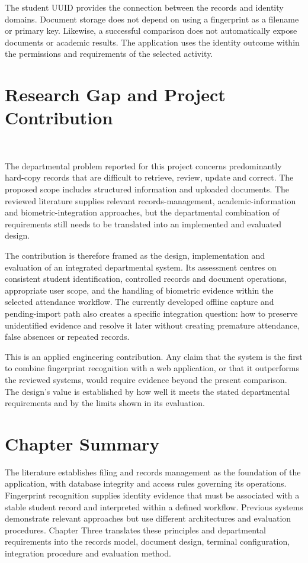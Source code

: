 The student UUID provides the connection between the records and identity domains. Document storage does not depend on using a fingerprint as a filename or primary key. Likewise, a successful comparison does not automatically expose documents or academic results. The application uses the identity outcome within the permissions and requirements of the selected activity.

\section{Research Gap and Project Contribution}~\label{sec:2-10}

The departmental problem reported for this project concerns predominantly hard-copy records that are difficult to retrieve, review, update and correct. The proposed scope includes structured information and uploaded documents. The reviewed literature supplies relevant records-management, academic-information and biometric-integration approaches, but the departmental combination of requirements still needs to be translated into an implemented and evaluated design.

The contribution is therefore framed as the design, implementation and evaluation of an integrated departmental system. Its assessment centres on consistent student identification, controlled records and document operations, appropriate user scope, and the handling of biometric evidence within the selected attendance workflow. The currently developed offline capture and pending-import path also creates a specific integration question: how to preserve unidentified evidence and resolve it later without creating premature attendance, false absences or repeated records.

This is an applied engineering contribution. Any claim that the system is the first to combine fingerprint recognition with a web application, or that it outperforms the reviewed systems, would require evidence beyond the present comparison. The design's value is established by how well it meets the stated departmental requirements and by the limits shown in its evaluation.

\section{Chapter Summary}\label{sec:2-11}

The literature establishes filing and records management as the foundation of the application, with database integrity and access rules governing its operations. Fingerprint recognition supplies identity evidence that must be associated with a stable student record and interpreted within a defined workflow. Previous systems demonstrate relevant approaches but use different architectures and evaluation procedures. Chapter Three translates these principles and departmental requirements into the records model, document design, terminal configuration, integration procedure and evaluation method.

